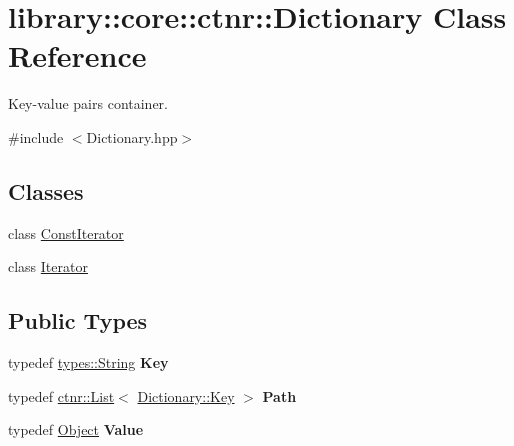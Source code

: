 \hypertarget{classlibrary_1_1core_1_1ctnr_1_1_dictionary}{}\section{library\+:\+:core\+:\+:ctnr\+:\+:Dictionary Class Reference}
\label{classlibrary_1_1core_1_1ctnr_1_1_dictionary}


Key-\/value pairs container.  




{\ttfamily \#include $<$Dictionary.\+hpp$>$}

\subsection*{Classes}
\begin{DoxyCompactItemize}
\item 
class \hyperlink{classlibrary_1_1core_1_1ctnr_1_1_dictionary_1_1_const_iterator}{Const\+Iterator}
\item 
class \hyperlink{classlibrary_1_1core_1_1ctnr_1_1_dictionary_1_1_iterator}{Iterator}
\end{DoxyCompactItemize}
\subsection*{Public Types}
\begin{DoxyCompactItemize}
\item 
\mbox{\label{classlibrary_1_1core_1_1ctnr_1_1_dictionary_a987cae687cce70d81a2a483c5e05e842}} 
typedef \hyperlink{classlibrary_1_1core_1_1types_1_1_string}{types\+::\+String} {\bfseries Key}
\item 
\mbox{\label{classlibrary_1_1core_1_1ctnr_1_1_dictionary_a5240b2a04a39b841ed81e52e962f0cbf}} 
typedef \hyperlink{_list_8hpp_a87ccf40619002299b341a5e76e989912}{ctnr\+::\+List}$<$ \hyperlink{classlibrary_1_1core_1_1types_1_1_string}{Dictionary\+::\+Key} $>$ {\bfseries Path}
\item 
\mbox{\label{classlibrary_1_1core_1_1ctnr_1_1_dictionary_a3baf6692694e4fc27cb399ac083c88ea}} 
typedef \hyperlink{classlibrary_1_1core_1_1ctnr_1_1_object}{Object} {\bfseries Value}
\end{DoxyCompactItemize}
